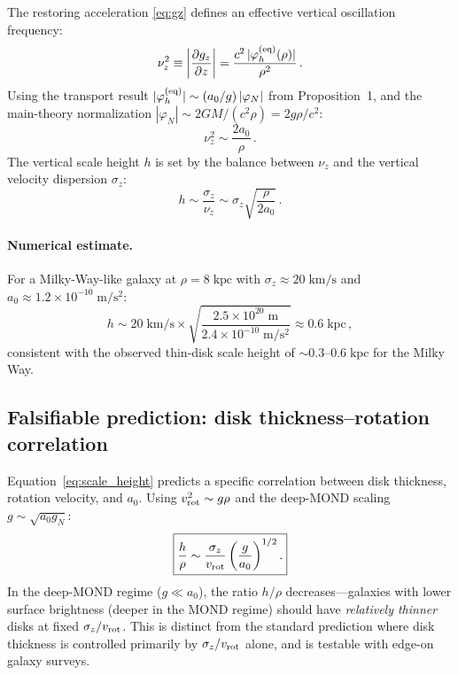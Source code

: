 \documentclass[11pt]{article}
\begin{document}
The restoring acceleration \eqref{eq:gz} defines an effective vertical oscillation frequency:
\begin{equation}
\nu_z^2 \equiv \left|\frac{\partial g_z}{\partial z}\right|
= \frac{c^2\,|\varphi_h^{(\rm eq)}(\rho)|}{\rho^2}\,.
\label{eq:nuz}
\end{equation}
Using the transport result $|\varphi_h^{(\rm eq)}|\sim (a_0/g)\,|\varphi_N|$ from Proposition~1, and the main-theory normalization
$|\varphi_N|\sim 2GM/(c^2\rho)=2g\rho/c^2$:
\begin{equation}
\nu_z^2 \sim \frac{2a_0}{\rho}\,.
\label{eq:nuz_scaling}
\end{equation}
The vertical scale height $h$ is set by the balance between $\nu_z$ and the vertical velocity dispersion $\sigma_z$:
\begin{equation}
h \sim \frac{\sigma_z}{\nu_z} \sim \sigma_z\sqrt{\frac{\rho}{2a_0}}\,.
\label{eq:scale_height}
\end{equation}

\paragraph{Numerical estimate.}
For a Milky-Way-like galaxy at $\rho=8\;\mathrm{kpc}$ with $\sigma_z\approx 20\;\mathrm{km/s}$ and $a_0\approx 1.2\times 10^{-10}\;\mathrm{m/s^2}$:
\begin{equation}
h \sim 20\;\mathrm{km/s}\times\sqrt{\frac{2.5\times 10^{20}\;\mathrm{m}}{2.4\times 10^{-10}\;\mathrm{m/s^2}}}
\approx 0.6\;\mathrm{kpc}\,,
\end{equation}
consistent with the observed thin-disk scale height of ${\sim}0.3$--$0.6\;\mathrm{kpc}$ for the Milky Way.

\subsection{Falsifiable prediction: disk thickness--rotation correlation}

Equation~\eqref{eq:scale_height} predicts a specific correlation between disk thickness, rotation velocity, and $a_0$. Using $v_{\rm rot}^2 \sim g\rho$ and the deep-MOND scaling $g\sim\sqrt{a_0 g_N}$:
\begin{equation}
\boxed{\frac{h}{\rho} \sim \frac{\sigma_z}{v_{\rm rot}}\left(\frac{g}{a_0}\right)^{1/2}.}
\label{eq:disk_prediction}
\end{equation}
In the deep-MOND regime ($g\ll a_0$), the ratio $h/\rho$ decreases---galaxies with lower surface brightness (deeper in the MOND regime) should have \emph{relatively thinner} disks at fixed $\sigma_z/v_{\rm rot}$. This is distinct from the standard prediction where disk thickness is controlled primarily by $\sigma_z/v_{\rm rot}$ alone, and is testable with edge-on galaxy surveys.
\end{document}
